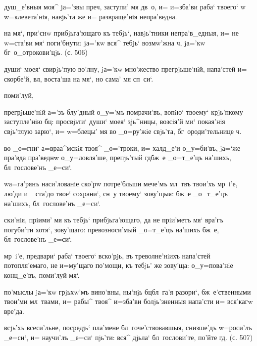 душ_е'вныя моя^ jа='звы преч, 
заступи' мя дв~о, и= и=зба'ви раба` твоего` w\т 
w=клевета'нiя, навjь'та же и= развраще'нiя непра'ведна.

  на мя`, при'снw прибjьга'ющаго къ 
тебjь`, навjь'тники непра'в_едныя, и= не w=ста'ви мя` 
поги'бнути: jа='кw вся^ тебjь` возмw'жна ч, jа='кw 
бг~о_отрокови'цjь. (с. 506)

   души` моея` свирjь'пую во'лну, 
jа='кw мно'жество прегрjьше'нiй, напа'стей и= скорбе'й, 
вл, воста'ша на мя`, но сама' мя сп~си`.

 поми'луй, 


 прегрjьше'нiй а='зъ блу'дный о_у='мъ 
помрачи'въ, вопiю` твоему` крjь'пкому заступле'нiю бц: 
просвjьти` души` моея` зjь^ницы, возсiя'й ми` покая'нiя 
свjь'тлую зарю`, и= w=блецы' мя во _о=ру'жiе свjь'та, 
бг~ороди'тельнице ч.


 во _о=гни` а=враа^мскiя твоя^ 
_о='троки, и= халд_е'и о_у=би'въ, jа=`же пра'вда 
пра'веднw о_у=ловля'ше, препjь'тый гд бж~е _о=т_е'цъ 
на'шихъ, бл~гослове'нъ _е=си`.

 w\т а=га'рянъ наси'лованiе ско'рw 
потре'бльши мече'мъ мл~твъ твои'хъ мр~i'е, лю'ди и= 
ста'до твое` сохрани`, сн~у твоему` зову'щыя: бж~е 
_о=т_е'цъ на'шихъ, бл~гослове'нъ _е=си`.

 ски'нiя, прiими' мя къ тебjь` 
прибjьга'ющаго, да не прiи'метъ мя` вра'гъ погуби'ти 
хотя`, зову'щаго: превозноси'мый _о=т_е'цъ на'шихъ бж~е, 
бл~гослове'нъ _е=си`.

  мр~i'е, предвари` раба` 
твоего` вско'рjь, въ треволне'нiихъ напа'стей 
потопля'емаго, не и=му'щаго по'мощи, къ тебjь' же 
зову'ща: о_у=пова'нiе конц_е'въ, поми'луй мя`.

   по'мыслы jа='кw 
грjьхw'мъ вино'вны, ны'нjь бц бл~га'я разори`, 
бж~е'ственными твои'ми мл~твами, и= рабы^ твоя^ и=зба'ви 
болjь'зненныя напа'сти и= вся'кагw вре'да.


  всjь'хъ всеси'льне, 
посредjь` пла'мене бл~гоче'ствовавшыя, снизше'дъ 
w=роси'лъ _е=си`, и= научи'лъ _е=си` пjь'ти: вся^ дjьла` 
бл~гослови'те, по'йте гд. (с. 507)

